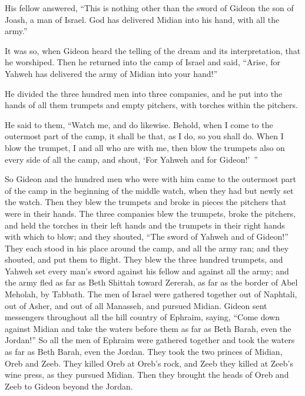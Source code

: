{\par }{\PP {}His fellow answered, “This is nothing other than the sword of Gideon the son of Joash, a man of Israel. God has delivered Midian into his hand, with all the army.”
\par }{\PP {}It was so, when Gideon heard the telling of the dream and its interpretation, that he worshiped. Then he returned into the camp of Israel and said, “Arise, for Yahweh has delivered the army of Midian into your hand!”
\par }{\PP {}He divided the three hundred men into three companies, and he put into the hands of all them trumpets and empty pitchers, with torches within the pitchers.
\par }{\PP {}He said to them, “Watch me, and do likewise. Behold, when I come to the outermost part of the camp, it shall be that, as I do, so you shall do.
When I blow the trumpet, I and all who are with me, then blow the trumpets also on every side of all the camp, and shout, ‘For Yahweh and for Gideon!’ ”
\par }{\PP {}So Gideon and the hundred men who were with him came to the outermost part of the camp in the beginning of the middle watch, when they had but newly set the watch. Then they blew the trumpets and broke in pieces the pitchers that were in their hands.
The three companies blew the trumpets, broke the pitchers, and held the torches in their left hands and the trumpets in their right hands with which to blow; and they shouted, “The sword of Yahweh and of Gideon!”
They each stood in his place around the camp, and all the army ran; and they shouted, and put them to flight.
They blew the three hundred trumpets, and Yahweh set every man’s sword against his fellow and against all the army; and the army fled as far as Beth Shittah toward Zererah, as far as the border of Abel Meholah, by Tabbath.
The men of Israel were gathered together out of Naphtali, out of Asher, and out of all Manasseh, and pursued Midian.
Gideon sent messengers throughout all the hill country of Ephraim, saying, “Come down against Midian and take the waters before them as far as Beth Barah, even the Jordan!” So all the men of Ephraim were gathered together and took the waters as far as Beth Barah, even the Jordan.
They took the two princes of Midian, Oreb and Zeeb. They killed Oreb at Oreb’s rock, and Zeeb they killed at Zeeb’s wine press, as they pursued Midian. Then they brought the heads of Oreb and Zeeb to Gideon beyond the Jordan.

}
